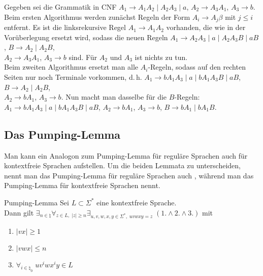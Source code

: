 \linie

\begin{Bsp}
    Gegeben sei die Grammatik in CNF
    $A_1 \rightarrow A_1 A_2 \;|\; A_2 A_3 \;|\; a$,\quad
    $A_2 \rightarrow A_3 A_1$,\quad
    $A_3 \rightarrow b$.\\
    Beim ersten Algorithmus werden zunächst Regeln der Form
    $A_i \rightarrow A_j \beta$ mit $j \le i$ entfernt.
    Es ist die linksrekursive Regel $A_1 \rightarrow A_1 A_2$ vorhanden,
    die wie in der Vorüberlegung ersetzt wird, sodass die neuen Regeln
    $A_1 \rightarrow A_2 A_3 \;|\; a \;|\; A_2 A_3 B \;|\; a B$,\quad
    $B \rightarrow A_2 \;|\; A_2 B$,\\
    $A_2 \rightarrow A_3 A_1$,\quad
    $A_3 \rightarrow b$ sind.
    Für $A_2$ und $A_3$ ist nichts zu tun.\\
    Beim zweiten Algorithmus ersetzt man alle $A_i$-Regeln, sodass auf den
    rechten Seiten nur noch Terminale vorkommen, d.\,h.
    $A_1 \rightarrow b A_1 A_3 \;|\; a \;|\; b A_1 A_3 B \;|\; a B$,\quad
    $B \rightarrow A_2 \;|\; A_2 B$,\\
    $A_2 \rightarrow b A_1$,\quad
    $A_3 \rightarrow b$.
    Nun macht man dasselbe für die $B$-Regeln:\\
    $A_1 \rightarrow b A_1 A_3 \;|\; a \;|\; b A_1 A_3 B \;|\; a B$,\qquad
    $A_2 \rightarrow b A_1$,\qquad
    $A_3 \rightarrow b$,\qquad
    $B \rightarrow b A_1 \;|\; b A_1 B$.
\end{Bsp}

\pagebreak

\subsection{%
    Das Pumping-Lemma%
}

\begin{Bem}
    Man kann ein Analogon zum Pumping-Lemma für reguläre Sprachen auch für
    kontextfreie Sprachen aufstellen.
    Um die beiden Lemmata zu unterscheiden, nennt man das Pumping-Lemma für
    reguläre Sprachen auch , während man das
    Pumping-Lemma für kontextfreie Sprachen  nennt.
\end{Bem}

\begin{Satz}{Pumping-Lemma}
    Sei $L \subset \Sigma^\ast$ eine kontextfreie Sprache.\\
    Dann gilt
    $\exists_{n \in \natural} \forall_{z \in L,\; |z| \ge n}
    \exists_{u, v, w, x, y \in \Sigma^\ast,\; uvwxy = z}\;
    (1. \land 2. \land 3.)$ mit
    \begin{enumerate}
        \item
        $|vx| \ge 1$
        
        \item
        $|vwx| \le n$
        
        \item
        $\forall_{i \in \natural_0}\; u v^i w x^i y \in L$
    \end{enumerate}
\end{Satz}

